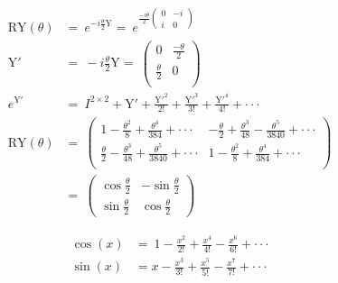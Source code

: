 \begin{equation}
    \begin{split}
        \mathrm{RY}(\theta) &=\ e^{-i\frac{\theta}{2}\mathrm{Y}} =\ e^{\frac{-i\theta}{2}\begin{pmatrix} 0 & -i \\ i & 0 \end{pmatrix}} \\
        \mathrm{Y}' &=\ -i\frac{\theta}{2}\mathrm{Y} =\ \begin{pmatrix}
                                                         0 & \frac{-\theta}{2}\\
                                                         \frac{\theta}{2} & 0\\
                                                    \end{pmatrix} \\
        e^{\mathrm{Y}'} &=\ I^{2\times2} + \mathrm{Y}' + \frac{\mathrm{Y}'^2}{2!} + \frac{\mathrm{Y}'^3}{3!} + \frac{\mathrm{Y}'^4}{4!} + \cdot\cdot\cdot \\
        \mathrm{RY}(\theta) &=\ \begin{pmatrix}
         1 - \frac{\theta^2}{8} + \frac{\theta^4}{384} + \cdot\cdot\cdot & - \frac{\theta}{2} + \frac{\theta^3}{48} - \frac{\theta^5}{3840} + \cdot\cdot\cdot\\
         \frac{\theta}{2} - \frac{\theta^3}{48} + \frac{\theta^5}{3840} + \cdot\cdot\cdot & 1 - \frac{\theta^2}{8} + \frac{\theta^4}{384} + \cdot\cdot\cdot \\
         \end{pmatrix}\\ &=\ \begin{pmatrix}
        \cos{\frac{\theta}{2}} & -\sin{\frac{\theta}{2}} \\
        \sin{\frac{\theta}{2}} & \cos{\frac{\theta}{2}}
    \end{pmatrix}
    \end{split}
    \label{equation:pauli_y_to_ry}
\end{equation}

\begin{equation}
    \begin{split}
        \cos(x) &=\ 1 - \frac{x^2}{2!} + \frac{x^4}{4!} - \frac{x^6}{6!} + \cdot\cdot\cdot \\
        \sin(x) &= x - \frac{x^3}{3!} + \frac{x^5}{5!} - \frac{x^7}{7!} + \cdot\cdot\cdot
    \end{split}
    \label{equation:power_series_sin_cos}
\end{equation}

